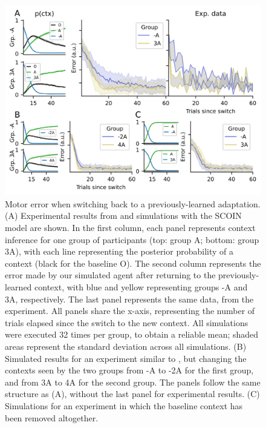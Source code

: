 \documentclass[a4paper,doc,floatsintext,natbib]{apa6}
\begin{document}
\begin{figure}
\centering
\includegraphics{./figures/figure_3.png}
\caption{Motor error when switching back to a previously-learned adaptation. (A) Experimental results from \cite{Davidson_Scaling_2004} and simulations with the SCOIN model are shown. In the first column, each panel represents context inference for one group of participants (top: group A; bottom: group 3A), with each line representing the posterior probability of a context (black for the baseline O). The second column represents the error made by our simulated agent after returning to the previously-learned context, with blue and yellow representing groups -A and 3A, respectively. The last panel represents the same data, from the \cite{Davidson_Scaling_2004} experiment. All panels share the x-axis, representing the number of trials elapsed since the switch to the new context. All simulations were executed 32 times per group, to obtain a reliable mean; shaded areas represent the standard deviation across all simulations. (B) Simulated results for an experiment similar to \cite{Davidson_Scaling_2004}, but changing the contexts seen by the two groups from -A to -2A for the first group, and from 3A to 4A for the second group. The panels follow the same structure as (A), without the last panel for experimental results. (C) Simulations for an experiment in which the baseline context has been removed altogether.}
\label{fig:davidson-2004}
\end{figure}
\end{document}
